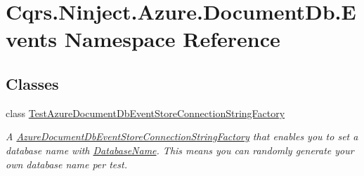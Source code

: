 \hypertarget{namespaceCqrs_1_1Ninject_1_1Azure_1_1DocumentDb_1_1Events}{}\section{Cqrs.\+Ninject.\+Azure.\+Document\+Db.\+Events Namespace Reference}
\label{namespaceCqrs_1_1Ninject_1_1Azure_1_1DocumentDb_1_1Events}
\subsection*{Classes}
\begin{DoxyCompactItemize}
\item 
class \hyperlink{classCqrs_1_1Ninject_1_1Azure_1_1DocumentDb_1_1Events_1_1TestAzureDocumentDbEventStoreConnectionStringFactory}{Test\+Azure\+Document\+Db\+Event\+Store\+Connection\+String\+Factory}
\begin{DoxyCompactList}\small\item\em A \hyperlink{classCqrs_1_1Azure_1_1DocumentDb_1_1Events_1_1AzureDocumentDbEventStoreConnectionStringFactory_a7503e00bedc6af5686ded0b6b7719a30_a7503e00bedc6af5686ded0b6b7719a30}{Azure\+Document\+Db\+Event\+Store\+Connection\+String\+Factory} that enables you to set a database name with \hyperlink{classCqrs_1_1Ninject_1_1Azure_1_1DocumentDb_1_1Events_1_1TestAzureDocumentDbEventStoreConnectionStringFactory_ad82e2485313ff7802ad125958173f3bf_ad82e2485313ff7802ad125958173f3bf}{Database\+Name}. This means you can randomly generate your own database name per test. \end{DoxyCompactList}\end{DoxyCompactItemize}

